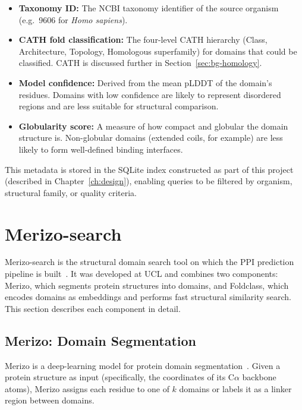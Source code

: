 \begin{itemize}
    \item \textbf{Taxonomy ID:} The NCBI taxonomy identifier of the source organism (e.g.\ 9606 for \textit{Homo sapiens}).
    \item \textbf{CATH fold classification:} The four-level CATH hierarchy (Class, Architecture, Topology, Homologous superfamily) for domains that could be classified. CATH is discussed further in Section~\ref{sec:bg-homology}.
    \item \textbf{Model confidence:} Derived from the mean pLDDT of the domain's residues. Domains with low confidence are likely to represent disordered regions and are less suitable for structural comparison.
    \item \textbf{Globularity score:} A measure of how compact and globular the domain structure is. Non-globular domains (extended coils, for example) are less likely to form well-defined binding interfaces.
\end{itemize}

This metadata is stored in the SQLite index constructed as part of this project (described in Chapter~\ref{ch:design}), enabling queries to be filtered by organism, structural family, or quality criteria.


\section{Merizo-search}
\label{sec:bg-merizo-search}

Merizo-search is the structural domain search tool on which the PPI prediction pipeline is built~\cite{merizo_search}.
It was developed at UCL and combines two components: Merizo, which segments protein structures into domains, and Foldclass, which encodes domains as embeddings and performs fast structural similarity search.
This section describes each component in detail.

\subsection{Merizo: Domain Segmentation}
\label{sec:bg-merizo-seg}

Merizo is a deep-learning model for protein domain segmentation~\cite{merizo}.
Given a protein structure as input (specifically, the coordinates of its C$\alpha$ backbone atoms), Merizo assigns each residue to one of $k$ domains or labels it as a linker region between domains.

